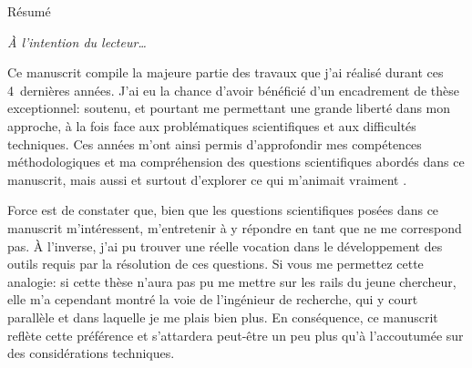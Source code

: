 
\thispagestyle{thesis-empty}

Résumé

\begin{comment}

\clearpage
\thispagestyle{thesis-empty}

\section*{Remerciements}
\label{sec:thanks}

la colloc étendu: théo, thomas, arthur, rémi, rémy, clément, sarah
parler du confinement ?
les potos: benjamin, marie, charlie, paul, jessie, piwi

la mifa

mon comité de thèse ? Sakina, Daniele

le 426 le meilleur bureau, tous les autres doctorants et post-doctorants et stagiaires
c'est quand même vachement plus fun avec elleux.

l'équipe admin du labo, bigup
\end{comment}

\clearpage
\thispagestyle{thesis-empty}

\vspace*{5ex}
\par\addvspace{\beforesecskip}\addvspace{\baselineskip}
\par\noindent\textit{À l'intention du lecteur\dots}\par
\vspace{\aftersecskip}

Ce manuscrit compile la majeure partie des travaux que j'ai réalisé durant ces 4~dernières années.
J'ai eu la chance d'avoir bénéficié d'un encadrement de thèse exceptionnel: soutenu, et pourtant me permettant une grande liberté dans mon approche, à la fois face aux problématiques scientifiques et aux difficultés techniques.
Ces années m'ont ainsi permis d'approfondir mes compétences méthodologiques et ma compréhension des questions scientifiques abordés dans ce manuscrit, mais aussi et surtout d'explorer ce qui m'animait vraiment .

Force est de constater que, bien que les questions scientifiques posées dans ce manuscrit m'intéressent, m'entretenir à y répondre en tant que  ne me correspond pas.
À l'inverse, j'ai pu trouver une réelle vocation dans le développement des outils requis par la résolution de ces questions.
Si vous me permettez cette analogie: si cette thèse n'aura pas pu me mettre sur les rails du jeune chercheur, elle m'a cependant montré la voie de l'ingénieur de recherche, qui y court parallèle et dans laquelle je me plais bien plus.
En conséquence, ce manuscrit reflète cette préférence et s'attardera peut-être un peu plus qu'à l'accoutumée sur des considérations techniques.

